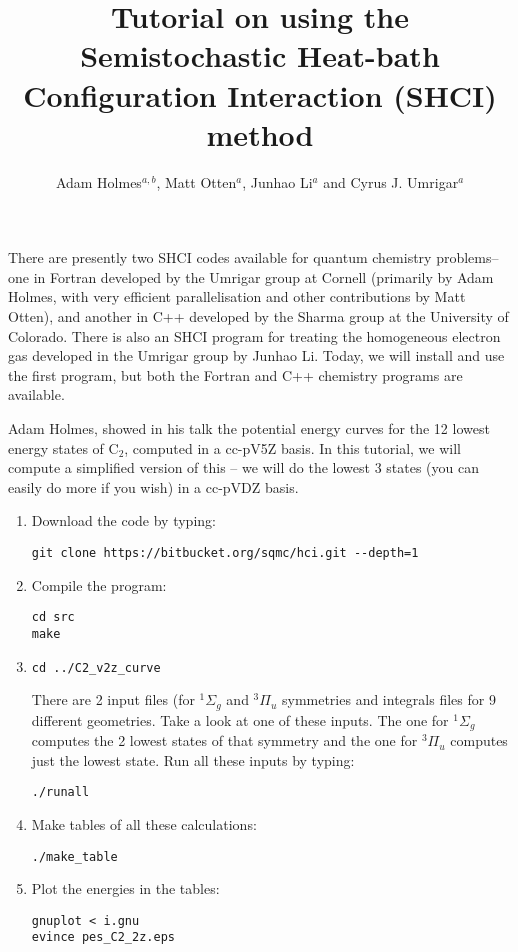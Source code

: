 \documentclass[12pt,aps,prb,groupedaddress,amsmath,amssymb]{revtex4-1}
\begin{document}
\title{Tutorial on using the Semistochastic Heat-bath Configuration Interaction (SHCI) method}

\author{Adam Holmes$^{a,b}$, Matt Otten$^a$, Junhao Li$^a$ and Cyrus J. Umrigar$^a$}

\maketitle

There are presently two SHCI codes available for quantum chemistry problems-- one in Fortran developed by the Umrigar group
at Cornell (primarily by Adam Holmes, with very efficient parallelisation and other contributions by Matt Otten), and another in C++
developed by the Sharma group at the University of Colorado.  There is also an SHCI program for treating the
homogeneous electron gas developed in the Umrigar group by Junhao Li.
Today, we will install and use the first program, but both the Fortran and C++ chemistry programs are available.

Adam Holmes, showed in his talk the potential energy curves for the 12 lowest energy states of C$_2$, computed in a cc-pV5Z basis.
In this tutorial, we will compute a simplified version of this -- we will do the lowest 3 states (you can easily do more if you wish)
in a cc-pVDZ basis.

\begin{enumerate}
\item Download the code by typing:
\begin{verbatim}
git clone https://bitbucket.org/sqmc/hci.git --depth=1
\end{verbatim}
\item
Compile the program:
\begin{verbatim}
cd src
make
\end{verbatim}
\item
\begin{verbatim}
cd ../C2_v2z_curve
\end{verbatim}
There are 2 input files (for $^1\Sigma_g$ and $^3\Pi_u$ symmetries and integrals files for 9 different geometries.  Take a look at one of these inputs.
The one for $^1\Sigma_g$ computes the 2 lowest states of that symmetry and the one for $^3\Pi_u$ computes just the lowest state.
Run all these inputs by typing:
\begin{verbatim}
./runall
\end{verbatim}
\item Make tables of all these calculations:
\begin{verbatim}
./make_table
\end{verbatim}
\item Plot the energies in the tables:
\begin{verbatim}
gnuplot < i.gnu
evince pes_C2_2z.eps
\end{verbatim}
\end{enumerate}
\end{document}
